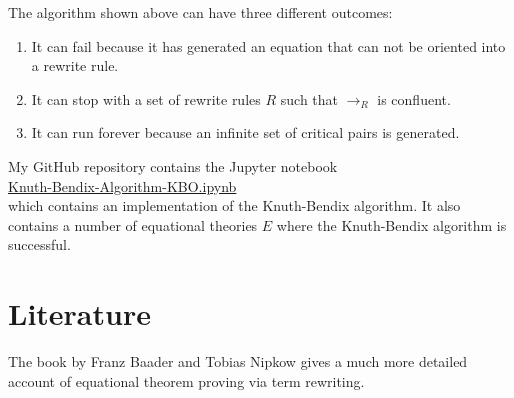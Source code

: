 \noindent
The algorithm shown above can have three different outcomes:
\begin{enumerate}
\item It can fail because it has generated an equation that can not be oriented into a rewrite rule.
\item It can stop with a set of rewrite rules $R$ such that $\rightarrow_R$ is confluent.
\item It can run forever because an infinite set of critical pairs is generated.
\end{enumerate} 
My GitHub repository contains the Jupyter notebook
\\[0.2cm]
\hspace*{1.3cm}
\href{https://github.com/karlstroetmann/Artificial-Intelligence/blob/master/Python/4%20Automatic%20Theorem%20Proving/Knuth-Bendix-Algorithm-KBO.ipynb}{Knuth-Bendix-Algorithm-KBO.ipynb}
\\[0.2cm]
which contains an implementation of the Knuth-Bendix algorithm.  It also contains a number of equational
theories $E$ where the Knuth-Bendix algorithm is successful.

\section{Literature}
The book  by Franz Baader and Tobias Nipkow \cite{baader:1998} gives a much
more detailed account of equational theorem proving via term rewriting.


